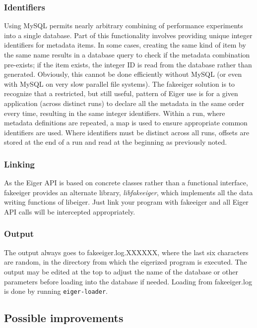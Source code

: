 \subsubsection{Identifiers} Using MySQL permits nearly arbitrary combining of performance experiments into a single database. Part of this functionality involves providing unique integer identifiers for metadata items. In some cases, creating the same kind of item by the same name results in a database query to check if the metadata combination pre-exists; if the item exists, the integer ID is read from the database rather than generated. Obviously, this cannot be done efficiently without MySQL (or even with MySQL on very slow parallel file systems). The fakeeiger solution is to recognize that a restricted, but still useful, pattern of Eiger use is for a given application (across distinct runs) to declare all the metadata in the same order every time, resulting in the same integer identifiers. Within a run, where metadata definitions are repeated, a map is used to ensure appropriate common identifiers are used. Where identifiers must be distinct across all runs, offsets are stored at the end of a run and read at the beginning as previously noted. 

\subsubsection{Linking} As the Eiger API is based on concrete classes rather than a functional interface, fakeeiger provides an alternate library, {\em libfakeeiger}, which implements all the data writing functions of libeiger. Just link your program with fakeeiger and all Eiger API calls will be intercepted appropriately.

\subsubsection{Output} The output always goes to fakeeiger.log.XXXXXX, where the last six characters are random, in the directory from which the eigerized program is executed. The output may be edited at the top to adjust the name of the database or other parameters before loading into the database if needed. Loading from fakeeiger.log is done by running \texttt{eiger-loader}.



\subsection{Possible improvements}

